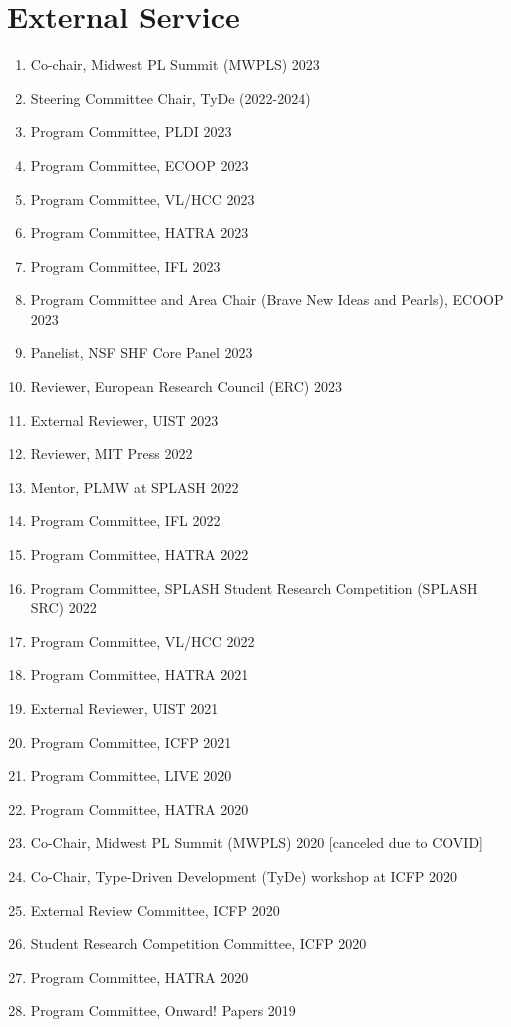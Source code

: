 \documentclass[10pt,letterpaper]{article}
\begin{document}
\section*{External Service}
\begin{enumerate}
  \item Co-chair, Midwest PL Summit (MWPLS) 2023
  \item Steering Committee Chair, TyDe (2022-2024)
  \item Program Committee, PLDI 2023
  \item Program Committee, ECOOP 2023
  \item Program Committee, VL/HCC 2023
  \item Program Committee, HATRA 2023
  \item Program Committee, IFL 2023
  \item Program Committee and Area Chair (Brave New Ideas and Pearls), ECOOP 2023
  \item Panelist, NSF SHF Core Panel 2023
  \item Reviewer, European Research Council (ERC) 2023
  \item External Reviewer, UIST 2023
  \item Reviewer, MIT Press 2022
  \item Mentor, PLMW at SPLASH 2022
  \item Program Committee, IFL 2022
  \item Program Committee, HATRA 2022
  \item Program Committee, SPLASH Student Research Competition (SPLASH SRC) 2022
  \item Program Committee, VL/HCC 2022
  \item Program Committee, HATRA 2021
  \item External Reviewer, UIST 2021
  \item Program Committee, ICFP 2021
  \item Program Committee, LIVE 2020
  \item Program Committee, HATRA 2020
  \item Co-Chair, Midwest PL Summit (MWPLS) 2020 [canceled due to COVID]
  \item Co-Chair, Type-Driven Development (TyDe) workshop at ICFP 2020
  \item External Review Committee, ICFP 2020
  \item Student Research Competition Committee, ICFP 2020
  \item Program Committee, HATRA 2020
  \item Program Committee, Onward! Papers 2019

\end{enumerate}
\end{document}
